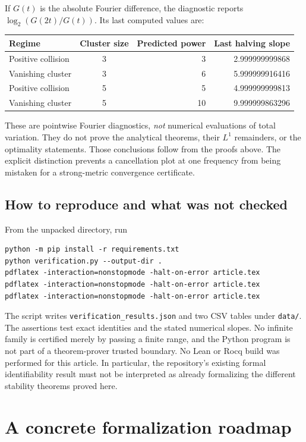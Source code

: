 \documentclass[11pt,a4paper]{article}
\numberwithin{equation}{section}
\theoremstyle{definition}
\theoremstyle{remark}
\begin{document}
If $G(t)$ is the absolute Fourier difference, the diagnostic reports
$\log_2(G(2t)/G(t))$.  Its last computed values are:
\begin{center}
\begin{tabular}{@{}lcrr@{}}
\toprule
Regime & Cluster size & Predicted power & Last halving slope\\
\midrule
Positive collision & 3 & 3 & 2.999999999868\\
Vanishing cluster & 3 & 6 & 5.999999916416\\
Positive collision & 5 & 5 & 4.999999999813\\
Vanishing cluster & 5 & 10 & 9.999999863296\\
\bottomrule
\end{tabular}
\end{center}
These are pointwise Fourier diagnostics, \emph{not} numerical evaluations of
total variation.  They do not prove the analytical theorems, their $L^1$
remainders, or the optimality statements.  Those conclusions follow from the
proofs above.  The explicit distinction prevents a cancellation plot at one
frequency from being mistaken for a strong-metric convergence certificate.

\subsection{How to reproduce and what was not checked}
From the unpacked directory, run
\begin{verbatim}
python -m pip install -r requirements.txt
python verification.py --output-dir .
pdflatex -interaction=nonstopmode -halt-on-error article.tex
pdflatex -interaction=nonstopmode -halt-on-error article.tex
pdflatex -interaction=nonstopmode -halt-on-error article.tex
\end{verbatim}
The script writes \texttt{verification\_results.json} and two CSV tables under
\texttt{data/}.  The assertions test exact identities and the stated numerical
slopes.  No infinite family is certified merely by passing a finite range,
and the Python program is not part of a theorem-prover trusted boundary.
No Lean or Rocq build was performed for this article.  In particular, the
repository's existing formal identifiability result must not be interpreted
as already formalizing the different stability theorems proved here.

\section{A concrete formalization roadmap}
\label{sec:formalization}
\end{document}
